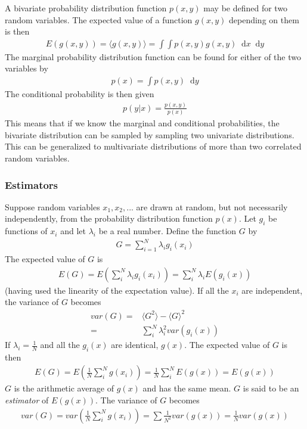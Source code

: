 \documentclass[twoside,english]{uiofysmaster}
\newcommand*\dif{\mathop{}\!\mathrm{d}}
\begin{document}
A bivariate probability distribution function $p(x,y)$ may be defined for two random variables. The expected value of a function $g(x,y)$ depending on them is then
\begin{align}
	E(g(x,y)) = \langle g(x,y) \rangle = \int \int p(x,y) g(x,y) \dif x \dif y
\end{align}
The marginal probability distribution function can be found for either of the two variables by 
\begin{align}
	p(x) = \int p(x,y) \dif y
\end{align}
The conditional probability is then given
\begin{align}
	p(y|x) = \frac{p(x,y)}{p(x)}
\end{align}
This means that if we know the marginal and conditional probabilities, the bivariate distribution can be sampled by sampling two univariate distributions. This can be generalized to multivariate distributions of more than two correlated random variables.

\subsubsection{Estimators}
Suppose random variables $x_1, x_2,...$ are drawn at random, but not necessarily independently, from the probability distribution function $p(x)$. Let $g_i$ be functions of $x_i$ and let $\lambda_i$ be a real number. Define the function $G$ by
\begin{align}
	G = \sum_{i=1}^N \lambda_i g_i (x_i)
\end{align}
The expected value of $G$ is
\begin{align}
	E(G) = E (\sum_i^N \lambda_i g_i(x_i)) = \sum_i^N \lambda_i E(g_i(x))
\end{align}
(having used the linearity of the expectation value). If all the $x_i$ are independent, the variance of $G$ becomes
\begin{align}
	var(G) =& \langle G^2 \rangle - \langle G \rangle^2 \\
	=& \sum_i^N \lambda_i^2 var(g_i(x))
\end{align}
If $\lambda_i=\frac{1}{N}$ and all the $g_i(x)$ are identical, $g(x)$. The expected value of $G$ is then
\begin{align}
	E(G) = E(\frac{1}{N} \sum_i^N g(x_i) ) = \frac{1}{N} \sum_i^N E(g(x)) = E(g(x))
\end{align} 
$G$ is the arithmetic average of $g(x)$ and has the same mean. $G$ is said to be an \textit{estimator} of $E(g(x))$. The variance of $G$ becomes
\begin{align}
	var(G) = var( \frac{1}{N} \sum_i^N g(x_i)  ) = \sum \frac{1}{N^2} var(g(x)) 
	= \frac{1}{N} var(g(x))
\end{align}
\end{document}
